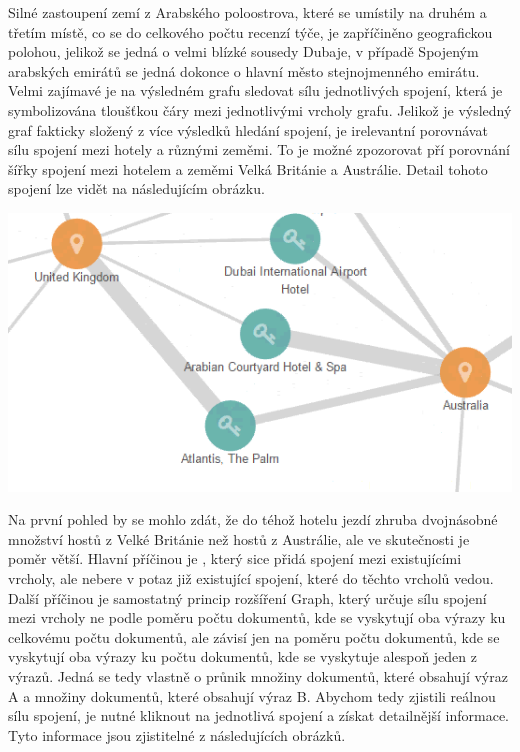 \documentclass[czech,BP]{thesiskiv}
\begin{document}
Silné zastoupení zemí z Arabského poloostrova, které se umístily na druhém a třetím místě, co se do celkového počtu recenzí týče, je zapříčiněno geografickou polohou, jelikož se jedná o velmi blízké sousedy Dubaje, v případě Spojeným arabských emirátů se jedná dokonce o hlavní město stejnojmenného emirátu.
\\
Velmi zajímavé je na výsledném grafu sledovat sílu jednotlivých spojení, která je symbolizována tloušťkou čáry mezi jednotlivými vrcholy grafu. Jelikož je výsledný graf fakticky složený z více výsledků hledání spojení, je irelevantní porovnávat sílu spojení mezi hotely a různými zeměmi. To je možné zpozorovat pří porovnání šířky spojení mezi hotelem  a zeměmi Velká Británie a Austrálie. Detail tohoto spojení lze vidět na následujícím obrázku.
\begin{center}
	\includegraphics[width=\textwidth]{img/detail_spojeni.PNG}
\end{center}
 Na první pohled by se mohlo zdát, že do téhož hotelu jezdí zhruba dvojnásobné množství hostů z Velké Británie než hostů z Austrálie, ale ve skutečnosti je poměr větší. Hlavní příčinou je , který sice přidá spojení mezi existujícími vrcholy, ale nebere v potaz již existující spojení, které do těchto vrcholů vedou. Další příčinou je samostatný princip rozšíření Graph, který určuje sílu spojení mezi vrcholy ne podle poměru počtu dokumentů, kde se vyskytují oba výrazy ku celkovému počtu dokumentů, ale závisí jen na poměru počtu dokumentů, kde se vyskytují oba výrazy ku počtu dokumentů, kde se vyskytuje alespoň jeden z výrazů. Jedná se tedy vlastně o průnik množiny dokumentů, které obsahují výraz A a množiny dokumentů, které obsahují výraz B. Abychom tedy zjistili reálnou sílu spojení, je nutné kliknout na jednotlivá spojení a získat detailnější informace. Tyto informace jsou zjistitelné z následujících obrázků.\\
\end{document}

